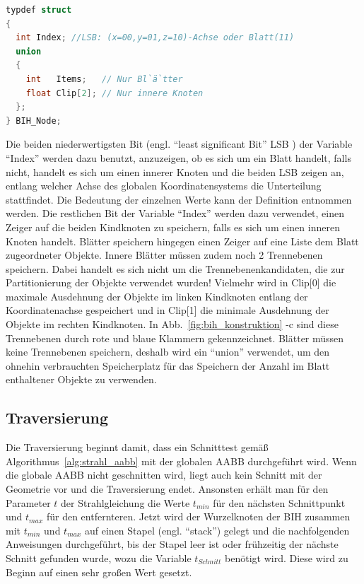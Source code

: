 \begin{lstlisting}[language=C,escapeinside=``]
typdef struct
{
  int Index; //LSB: (x=00,y=01,z=10)-Achse oder Blatt(11)
  union
  {
    int   Items;   // Nur Bl`ä`tter
    float Clip[2]; // Nur innere Knoten
  };
} BIH_Node;
\end{lstlisting}


Die beiden niederwertigsten Bit (engl. "`least significant Bit"' LSB ) der Variable "`Index"' werden dazu benutzt, anzuzeigen, ob es sich um ein Blatt handelt, falls nicht, handelt es sich um einen innerer Knoten und die beiden LSB zeigen an, entlang welcher Achse des globalen Koordinatensystems die Unterteilung stattfindet. Die Bedeutung der einzelnen Werte kann der Definition entnommen werden. Die restlichen Bit der Variable "`Index"' werden dazu verwendet, einen Zeiger auf die beiden Kindknoten zu speichern, falls es sich um einen inneren Knoten handelt. Blätter speichern hingegen einen Zeiger auf eine Liste dem Blatt zugeordneter Objekte.
Innere Blätter müssen zudem noch 2 Trennebenen speichern. Dabei handelt es sich nicht um die Trennebenenkandidaten, die zur Partitionierung der Objekte verwendet wurden! Vielmehr wird in Clip[0] die maximale Ausdehnung der Objekte im linken Kindknoten entlang der Koordinatenachse gespeichert und in Clip[1] die minimale Ausdehnung der Objekte im rechten Kindknoten. In Abb.~\ref{fig:bih_konstruktion} -c sind diese Trennebenen durch rote und blaue Klammern gekennzeichnet. Blätter müssen keine Trennebenen speichern, deshalb wird ein "`union"' verwendet, um den ohnehin verbrauchten Speicherplatz für das Speichern der Anzahl im Blatt enthaltener Objekte zu verwenden.


\subsection{Traversierung}

Die Traversierung beginnt damit, dass ein Schnitttest gemäß Algorithmus~\ref*{alg:strahl_aabb} mit der globalen AABB durchgeführt wird. Wenn die globale AABB nicht geschnitten wird, liegt auch kein Schnitt mit der Geometrie vor und die Traversierung endet. Ansonsten erhält man für den Parameter \( t \) der Strahlgleichung die Werte \( t_{min} \) für den nächsten Schnittpunkt und \( t_{max} \) für den entfernteren.
Jetzt wird der Wurzelknoten der BIH zusammen mit \( t_{min} \) und \( t_{max} \) auf einen Stapel (engl. "`stack"') gelegt und die nachfolgenden Anweisungen durchgeführt, bis der Stapel leer ist oder frühzeitig der nächste Schnitt gefunden wurde, wozu die Variable \( t_{Schnitt} \) benötigt wird. Diese wird zu Beginn auf einen sehr großen Wert gesetzt.

